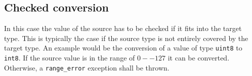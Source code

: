 \subsection{Checked conversion}

In this case the value of the source has to be checked if it fits into the
target type. This is typically the case if the source type is not entirely
covered by the target type. An example would be the conversion of a value of 
type \texttt{uint8} to \texttt{int8}. If the source value is in the range of 
$0--127$ it can be converted. Otherwise, a \texttt{range\_error} exception 
shall be thrown. 
